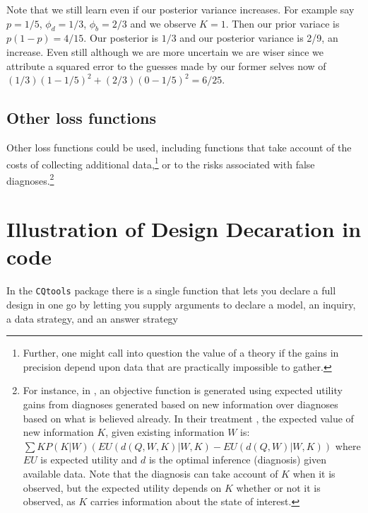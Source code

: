 \documentclass[
  12pt,
]{book}
\begin{document}
Note that we still learn even if our posterior variance increases. For example say \(p = 1/5\), \(\phi_d = 1/3\), \(\phi_b = 2/3\) and we observe \(K=1\). Then our prior variace is \(p(1-p) = 4/15\). Our posterior is \(1/3\) and our posterior variance is 2/9, an increase. Even still although we are more uncertain we are wiser since we attribute a squared error to the guesses made by our former selves now of \((1/3)(1-1/5)^2 + (2/3)(0 - 1/5)^2 = 6/25\).

\hypertarget{other-loss-functions}{%
\subsection{Other loss functions}\label{other-loss-functions}}

Other loss functions could be used, including functions that take account of the costs of collecting additional data,\footnote{Further, one might call into question the value of a theory if the gains in precision depend upon data that are practically impossible to gather.} or to the risks associated with false diagnoses.\footnote{For instance, in \citet{heckerman1991toward}, an objective function is generated using expected utility gains from diagnoses generated based on new information over diagnoses based on what is believed already. In their treatment \citep[Equation 6]{heckerman1991toward}, the expected value of new information \(K\), given existing information \(W\) is: \(\sum{K}P(K|W)( EU(d(Q,W,K)|W, K) - EU(d(Q, W)|W, K))\) where \(EU\) is expected utility and \(d\) is the optimal inference (diagnosis) given available data. Note that the diagnosis can take account of \(K\) when it is observed, but the expected utility depends on \(K\) whether or not it is observed, as \(K\) carries information about the state of interest.}

\hypertarget{illustration-of-design-decaration-in-code}{%
\section{Illustration of Design Decaration in code}\label{illustration-of-design-decaration-in-code}}

In the \texttt{CQtools} package there is a single function that lets you declare a full design in one go by letting you supply arguments to declare a model, an inquiry, a data strategy, and an answer strategy
\end{document}
